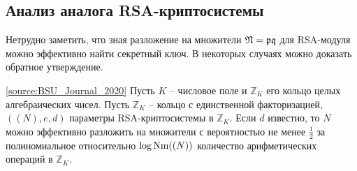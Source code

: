 \documentclass[_00_dissertation.tex]{subfiles}
\begin{document}
\subsection{Анализ аналога RSA-криптосистемы}

Нетрудно заметить, что зная разложение на множители $\mathfrak{N}=\mathfrak{p}\mathfrak{q}$ для RSA-модуля можно эффективно найти секретный ключ.
В некоторых случаях можно доказать обратное утверждение.

\begin{theorem}\label{theorem:factor}\ref{source:BSU_Journal_2020}
    Пусть $K$ -- числовое поле и $\mathbb{Z}_K$ его кольцо целых алгебраических чисел.
    Пусть $\mathbb{Z}_K$ -- кольцо с единственной факторизацией, $((N), e, d)$ параметры RSA-криптосистемы в $\mathbb{Z}_K$.
    Если $d$ известно, то $N$ можно эффективно разложить на множители с вероятностью не менее $\frac{1}{2}$ за полиномиальное относительно $\log \textrm{Nm}((N))$ количество арифметических операций в $\mathbb{Z}_K$.
\end{theorem}
\end{document}
